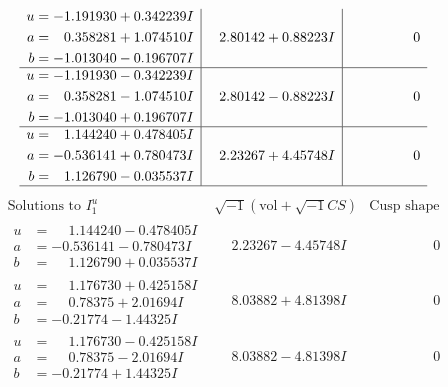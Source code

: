 \documentclass[1p]{elsarticle_modified}
\theoremstyle{definition}
\newcommand{\I}{\sqrt{-1}}
\begin{document}
$$\begin{array}{c|c|c}
\begin{aligned}
u &= -1.191930 + 0.342239 I \\
a &= \phantom{-}0.358281 + 1.074510 I \\
b &= -1.013040 - 0.196707 I\end{aligned}
 & \phantom{-}2.80142 + 0.88223 I & \phantom{-0.000000 } 0 \\ \hline\begin{aligned}
u &= -1.191930 - 0.342239 I \\
a &= \phantom{-}0.358281 - 1.074510 I \\
b &= -1.013040 + 0.196707 I\end{aligned}
 & \phantom{-}2.80142 - 0.88223 I & \phantom{-0.000000 } 0 \\ \hline\begin{aligned}
u &= \phantom{-}1.144240 + 0.478405 I \\
a &= -0.536141 + 0.780473 I \\
b &= \phantom{-}1.126790 - 0.035537 I\end{aligned}
 & \phantom{-}2.23267 + 4.45748 I & \phantom{-0.000000 } 0\\
 \hline 
 \end{array}$$\newpage$$\begin{array}{c|c|c}  
\text{Solutions to }I^u_{1}& \I (\text{vol} + \sqrt{-1}CS) & \text{Cusp shape}\\
 \hline 
\begin{aligned}
u &= \phantom{-}1.144240 - 0.478405 I \\
a &= -0.536141 - 0.780473 I \\
b &= \phantom{-}1.126790 + 0.035537 I\end{aligned}
 & \phantom{-}2.23267 - 4.45748 I & \phantom{-0.000000 } 0 \\ \hline\begin{aligned}
u &= \phantom{-}1.176730 + 0.425158 I \\
a &= \phantom{-}0.78375 + 2.01694 I \\
b &= -0.21774 - 1.44325 I\end{aligned}
 & \phantom{-}8.03882 + 4.81398 I & \phantom{-0.000000 } 0 \\ \hline\begin{aligned}
u &= \phantom{-}1.176730 - 0.425158 I \\
a &= \phantom{-}0.78375 - 2.01694 I \\
b &= -0.21774 + 1.44325 I\end{aligned}
 & \phantom{-}8.03882 - 4.81398 I & \phantom{-0.000000 } 0 \\ \hline\begin{aligned}

\end{aligned}
\end{array}$$
\end{document}
